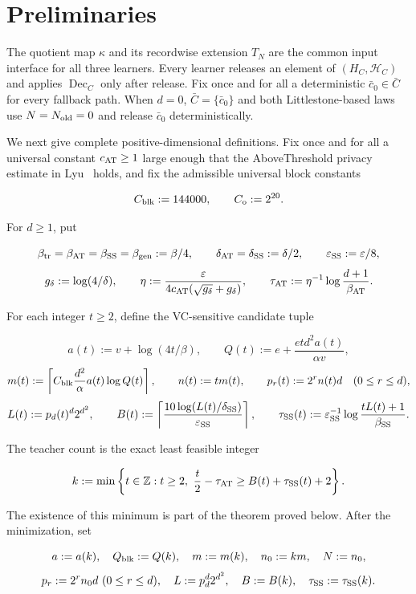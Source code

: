 \section{Preliminaries}

The quotient map $\kappa$ and its recordwise extension $T_N$ are the common
input interface for all three learners.  Every learner releases an element of
$(H_C,\mathcal H_C)$ and applies $\operatorname{Dec}_C$ only after release.
Fix once and for all a deterministic $\bar c_0\in\bar C$ for every fallback
path.  When $d=0$, $\bar C=\{\bar c_0\}$ and both Littlestone-based laws use
$N=N_{\rm old}=0$ and release $\bar c_0$ deterministically.

We next give complete positive-dimensional definitions.  Fix once and for
all a universal constant $c_{\rm AT}\ge1$ large enough that the
AboveThreshold privacy estimate in Lyu~\citep[Lemma~3.2]{lyu2025} holds,
and fix the admissible universal block constants

\[
 C_{\rm blk}:=144000,
 \qquad C_{\rm o}:=2^{20}.
\]

For $d\ge1$, put

\[
 \beta_{\rm tr}=\beta_{\rm AT}=\beta_{\rm SS}=\beta_{\rm gen}:=\beta/4,
 \qquad
 \delta_{\rm AT}=\delta_{\rm SS}:=\delta/2,
 \qquad \varepsilon_{\rm SS}:=\varepsilon/8,
\]
\[
 g_\delta:=\log(4/\delta),
 \qquad
 \eta:=\frac{\varepsilon}
 {4c_{\rm AT}(\sqrt{g_\delta}+g_\delta)},
 \qquad
 \tau_{\rm AT}:=\eta^{-1}\log\frac{d+1}{\beta_{\rm AT}}.
\]

For each integer $t\ge2$, define the VC-sensitive candidate tuple

\[
 a(t):=v+\log(4t/\beta),
 \qquad
 Q(t):=e+\frac{etd^2a(t)}{\alpha v},
\]
\[
 m(t):=\left\lceil C_{\rm blk}\frac{d^2}{\alpha}
 a(t)\log Q(t)\right\rceil,
 \qquad n(t):=tm(t),
 \qquad p_r(t):=2^rn(t)d\quad(0\le r\le d),
\]
\[
 L(t):=p_d(t)^d2^{d^2},
 \qquad
 B(t):=\left\lceil
 \frac{10\log(L(t)/\delta_{\rm SS})}{\varepsilon_{\rm SS}}
 \right\rceil,
 \qquad
 \tau_{\rm SS}(t):=\varepsilon_{\rm SS}^{-1}
 \log\frac{tL(t)+1}{\beta_{\rm SS}}.
\]

The teacher count is the exact least feasible integer

\[
 k:=\min\left\{t\in\mathbb Z:t\ge2,
 \ \frac t2-\tau_{\rm AT}\ge B(t)+\tau_{\rm SS}(t)+2\right\}.
\]

The existence of this minimum is part of the theorem proved below.  After
the minimization, set

\[
 a:=a(k),\quad Q_{\rm blk}:=Q(k),\quad
 m:=m(k),\quad n_0:=km,\quad N:=n_0,
\]
\[
 p_r:=2^rn_0d\ (0\le r\le d),\quad
 L:=p_d^d2^{d^2},\quad B:=B(k),\quad
 \tau_{\rm SS}:=\tau_{\rm SS}(k).
\]

